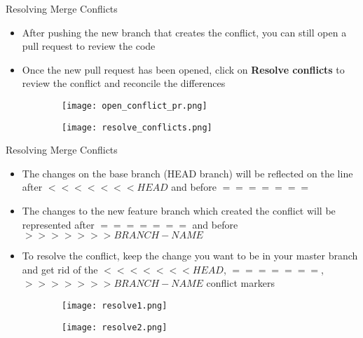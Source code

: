 \documentclass{beamer}
\begin{document}
\begin{frame}{Resolving Merge Conflicts}
\begin{itemize}
    \item After pushing the new branch that creates the conflict, you can still open a pull request to review the code
    \item Once the new pull request has been opened, click on \textbf{Resolve conflicts} to review the conflict and reconcile the differences
\end{itemize}
\begin{figure}
\centering
\begin{subfigure}{\textwidth}
  \centering
  \texttt{[image: open\_conflict\_pr.png]}
\end{subfigure}%
\hspace{1cm}
\begin{subfigure}{\textwidth}
  \centering
  \texttt{[image: resolve\_conflicts.png]}
\end{subfigure}
\end{figure}
\end{frame}

\begin{frame}{Resolving Merge Conflicts}
\begin{itemize}
    \item The changes on the base branch (HEAD branch) will be reflected on the line after $<<<<<<< HEAD$ and before $=======$
    \item The changes to the new feature branch which created the conflict will be represented after $=======$ and before $>>>>>>> BRANCH-NAME$
    \item To resolve the conflict, keep the change you want to be in your master branch and get rid of the $<<<<<<< HEAD$, $=======$, $>>>>>>> BRANCH-NAME$ conflict markers
\end{itemize}
\begin{figure}
\centering
\begin{subfigure}{\textwidth}
  \centering
  \texttt{[image: resolve1.png]}
\end{subfigure}%
\hspace{1cm}
\begin{subfigure}{\textwidth}
  \centering
  \texttt{[image: resolve2.png]}
\end{subfigure}
\end{figure}
\end{frame}
\end{document}
